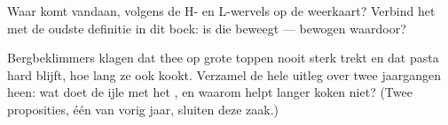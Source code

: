 \begin{exercise}[$\star\star$]\label{exo:g5:air-pressure-weather:10}
Waar komt  vandaan, volgens de H- en L-wervels op de weerkaart?
Verbind het met de oudste definitie in dit boek:  is
 die beweegt --- bewogen waardoor?
\end{exercise}

\begin{exercise}[$\star\star$]\label{exo:g5:air-pressure-weather:11}
Bergbeklimmers klagen dat thee op grote toppen nooit sterk trekt en
dat pasta hard blijft, hoe lang ze ook kookt. Verzamel de hele uitleg
over twee jaargangen heen: wat doet de ijle  met het
, en waarom helpt langer koken niet? (Twee proposities, één
van vorig jaar, sluiten deze zaak.)
\end{exercise}
